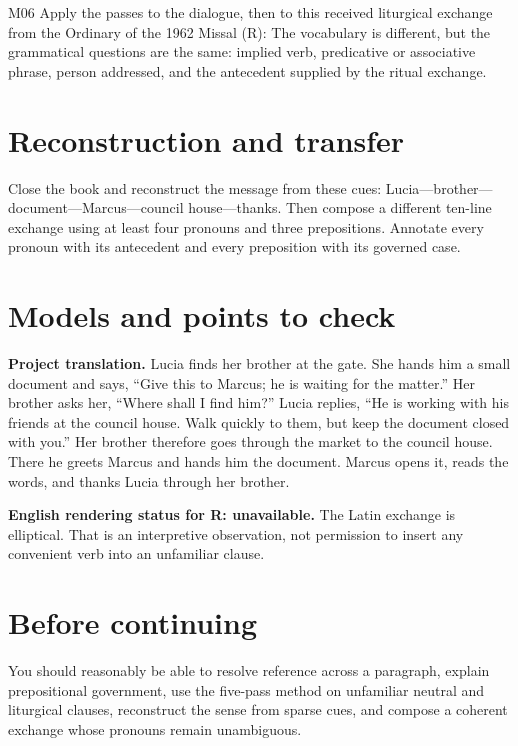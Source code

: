 \begin{courseunit}{M06}
Apply the passes to the dialogue, then to this received liturgical exchange
from the Ordinary of the 1962 Missal (R):   The vocabulary is different, but the grammatical questions are
the same: implied verb, predicative or associative phrase, person addressed,
and the antecedent supplied by the ritual exchange.

\section{Reconstruction and transfer}

Close the book and reconstruct the message from these cues: Lucia---brother---
document---Marcus---council house---thanks.  Then compose a different ten-line
exchange using at least four pronouns and three prepositions.  Annotate every
pronoun with its antecedent and every preposition with its governed case.

\ifsolutions
\section{Models and points to check}

\textbf{Project translation.} Lucia finds her brother at the gate. She hands
him a small document and says, ``Give this to Marcus; he is waiting for the
matter.'' Her brother asks her, ``Where shall I find him?'' Lucia replies, ``He
is working with his friends at the council house. Walk quickly to them, but
keep the document closed with you.'' Her brother therefore goes through the
market to the council house. There he greets Marcus and hands him the document.
Marcus opens it, reads the words, and thanks Lucia through her brother.

\textbf{English rendering status for R: unavailable.}
The Latin exchange is elliptical.  That is an
interpretive observation, not permission to insert any convenient verb into
an unfamiliar clause.
\else
\section{Before continuing}

You should reasonably be able to resolve reference across a paragraph, explain
prepositional government, use the five-pass method on unfamiliar neutral and
liturgical clauses, reconstruct the sense from sparse cues, and compose a
coherent exchange whose pronouns remain unambiguous.
\fi
\end{courseunit}

